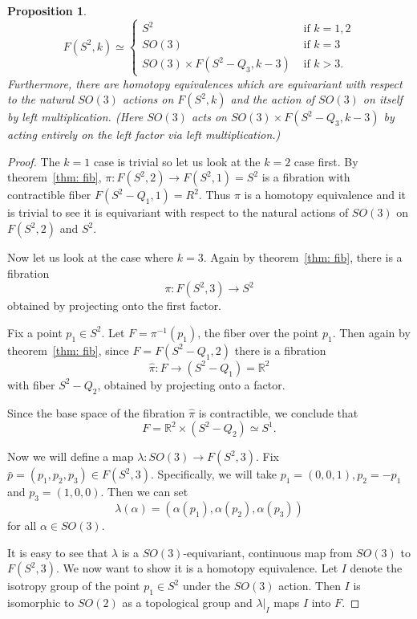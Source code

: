 \documentclass{amsart}
\newtheorem{prop}[thm]{Proposition}
\begin{document}
\begin{prop}
\label{pro: configsphere}
$$
F(S^2,k) \simeq
\begin{cases}
S^2 &\text{ if } k=1,2 \\
SO(3) &\text{ if } k=3 \\
SO(3) \times F(S^2 - Q_3, k-3) &\text{ if } k>3.
\end{cases}
$$
Furthermore, there are homotopy equivalences which are equivariant with
respect to the natural $SO(3)$ actions on $F(S^2,k)$ and the action of
$SO(3)$ on itself by left multiplication. (Here $SO(3)$
acts on $SO(3) \times F(S^2 - Q_3, k-3)$ by acting entirely on the left
factor via left multiplication.) 
\end{prop}
\begin{proof}
The $k=1$ case is trivial so let us look at the $k=2$ case first. 
By theorem~\ref{thm: fib}, 
$\pi: F(S^2,2) \rightarrow F(S^2,1)=S^2$ is a fibration with
contractible fiber $F(S^2 - Q_1, 1)=R^2$. Thus $\pi$ is a homotopy
equivalence and it is trivial to see it is equivariant with respect to the
natural actions of $SO(3)$ on $F(S^2,2)$ and $S^2$.

Now let us look at the case where $k=3$.
Again by theorem~\ref{thm: fib}, there is a fibration
$$
\pi: F(S^2,3) \rightarrow S^2
$$ 
obtained by projecting onto the first factor.

Fix a point $p_1 \in S^2$. Let $F=\pi^{-1}(p_1)$, the fiber over the point
$p_1$. 
Then again by theorem~\ref{thm: fib},
since $F=F(S^2 - Q_1,2)$ there is a fibration 
$$
\hat{\pi} : F \rightarrow (S^2-Q_1)=
\mathbb{R}^2
$$ 
with fiber $S^2-Q_2$, obtained by projecting onto a factor. 

Since
the base space of the fibration $\hat{\pi}$ is contractible, we conclude that
$$
F = \mathbb{R}^2 \times (S^2 - Q_2) \simeq S^1.
$$

Now we will define a map $\lambda : SO(3) \rightarrow F(S^2,3)$. Fix
$\bar{p}=(p_1,p_2,p_3) \in F(S^2,3)$. Specifically, we will take
$p_1=(0,0,1), p_2=-p_1$ and $p_3=(1,0,0)$. Then we can set
$$
\lambda(\alpha) = (\alpha(p_1),\alpha(p_2),\alpha(p_3))
$$ 
for all $\alpha \in
SO(3)$. 

It is easy to see that $\lambda$ is a $SO(3)$-equivariant, continuous
map from $SO(3)$ to $F(S^2,3)$. We now want to show it is a homotopy
equivalence. Let $I$ denote the isotropy group of the point $p_1 \in S^2$
under the $SO(3)$ action. Then $I$ is isomorphic to $SO(2)$ as a topological
group and $\lambda|_I$ maps $I$ into $F$. 


\end{proof}
\end{document}

